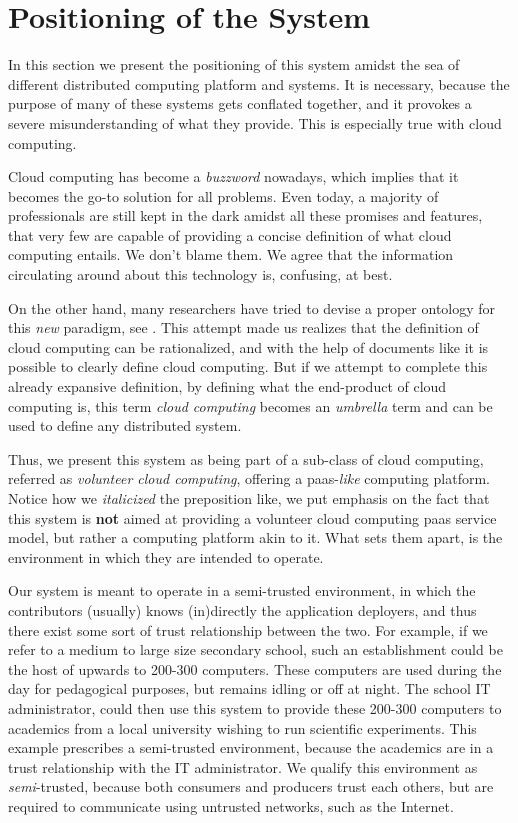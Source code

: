 \documentclass[12pt, titlepage]{uo_temp}
\begin{document}
     \section{Positioning of the System}
     In this section we present the positioning of this system amidst the sea of different
     distributed computing platform and systems. It is necessary, because the
     purpose of many of these systems gets conflated together, and it provokes a severe
     misunderstanding of what they provide. This is especially true with cloud computing.

     Cloud computing has become a \emph{buzzword} nowadays, which implies that it becomes
     the go-to solution for all problems. Even today, a majority of professionals are
     still kept in the dark amidst all these promises and features, that very few are
     capable of providing a concise definition of what cloud computing entails. We don't
     blame them. We agree that the information circulating around about this technology is,
     confusing, at best. 
     
     On the other hand, many researchers have tried to devise a proper ontology for this
     \emph{new} paradigm, see \cite{ontology}. This attempt made us realizes that the
     definition of cloud computing can be rationalized, and with the help of documents
     like \cite{nist} it is possible to clearly define cloud computing. But if we attempt
     to complete this already expansive definition, by defining what the end-product of
     cloud computing is, this term \emph{cloud computing} becomes an \emph{umbrella} term
     and can be used to define any distributed system.

     Thus, we present this system as being part of a sub-class of cloud computing,
     referred as \emph{volunteer cloud computing}, offering a \gls{paas}-\emph{like} computing
     platform. Notice how we \emph{italicized} the preposition like, we put emphasis on
     the fact that this system is \textbf{not} aimed at providing a volunteer cloud
     computing \gls{paas} service model, but rather a computing platform akin to it. What
     sets them apart, is the environment in which they are intended to operate. 
     
     Our system is meant to operate in a semi-trusted environment, in which the
     contributors (usually) knows (in)directly the application deployers, and thus there
     exist some sort of trust relationship between the two. For example, if we refer to a
     medium to large size secondary school, such an establishment could be the host of
     upwards to 200-300 computers. These computers are used during the day for pedagogical
     purposes, but remains idling or off at night. The school IT administrator, could then
     use this system to provide these 200-300 computers to academics from a local
     university wishing to run scientific experiments. This example prescribes a
     semi-trusted environment, because the academics are in a trust relationship with the
     IT administrator. We qualify this environment as \emph{semi}-trusted, because both
     consumers and producers trust each others, but are required to communicate using
     untrusted networks, such as the Internet.
\end{document}
